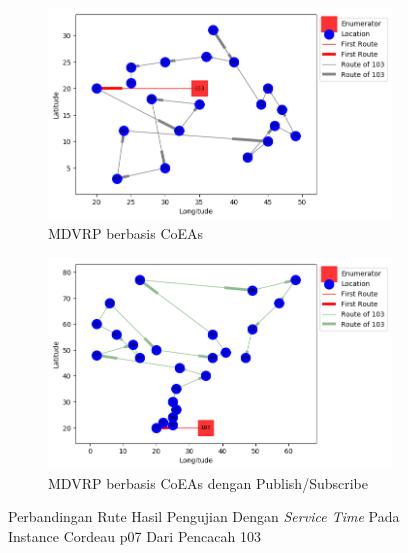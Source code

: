 \begin{figure}[H]
	\centering
	\begin{subfigure}[t]{\textwidth}
		\centering
		\includegraphics[width=\textwidth]{Resources/Images/cordeau_p07_tw/cordeau_p07_tw_103_coes}
		\caption{MDVRP berbasis CoEAs}
		\label{fig:cordeau_p07_tw_103_coes}
	\end{subfigure}
	\begin{subfigure}[t]{\textwidth}
		\centering
		\includegraphics[width=\textwidth]{Resources/Images/cordeau_p07_tw/cordeau_p07_tw_103_pubsub_coes}
		\caption{MDVRP berbasis CoEAs dengan Publish/Subscribe}
		\label{fig:cordeau_p07_tw_103_pubsub_coes}
	\end{subfigure}
	\caption{Perbandingan Rute Hasil Pengujian Dengan \textit{Service Time} Pada Instance Cordeau p07 Dari Pencacah 103}
	\label{fig:cordeau_p07_tw_103}
\end{figure}



